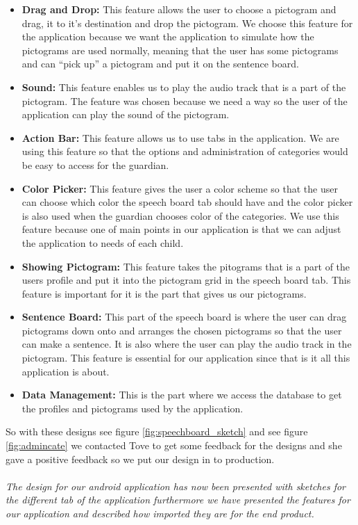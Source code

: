 \begin{itemize}
	\item \textbf{Drag and Drop:} This feature allows the user to choose a pictogram and drag, it to it's destination and drop the pictogram.  We choose this feature for the application because we want the application to simulate how the pictograms are used normally, meaning that the user has some pictograms and can ``pick up'' a pictogram and put it on the sentence board.  
	\item \textbf{Sound:} This feature enables us to play the audio track that is a part of the pictogram. The feature was chosen because we need a way so the user of the application can play the sound of the pictogram. 
	\item \textbf{Action Bar:} This feature allows us to use tabs in the application. We are using this feature so that the options and administration of categories would be easy to access for the guardian. 
	\item \textbf{Color Picker:} This feature gives the user a color scheme so that the user can choose which color the speech board tab should have and the color picker is also used when the guardian chooses color of the categories. We use this feature because one of main points in our application is that we can adjust the application to needs of each child. 
	\item \textbf{Showing Pictogram:} This feature takes the pitograms that is a part of the users profile and put it into the pictogram grid in the speech board tab. This feature is important for it is the part that gives us our pictograms. 
	\item \textbf{Sentence Board:} This part of the speech board is where the user can drag pictograms down onto and arranges the chosen pictograms so that the user can make a sentence. It is also where the user can play the audio track in the pictogram. This feature is essential for our application since that is it all this application is about. 
	\item \textbf{Data Management:} This is the part where we access the database to get the profiles and pictograms used by the application.
\end{itemize}

So with these designs see figure \ref{fig:speechboard_sketch} and see figure \ref{fig:admincate} we contacted Tove to get some feedback for the designs and she gave a positive feedback so we put our design in to production.\\  
\\
\textit{The design for our android application has now been presented with sketches for the different tab of the application furthermore we have presented the  features for our application and described how imported they are for the end product.} 